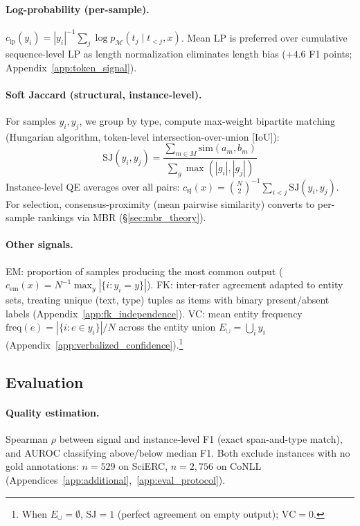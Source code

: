 \paragraph{Log-probability (per-sample).}
$c_{\text{lp}}(y_i) = |y_i|^{-1} \sum_{j} \log p_{\mathcal{M}}(t_j \mid t_{<j}, x)$.
Mean LP is preferred over cumulative sequence-level LP as length normalization eliminates length bias ($+4.6$ F1 points; Appendix~\ref{app:token_signal}).

\paragraph{Soft Jaccard (structural, instance-level).}
For samples $y_i, y_j$, we group by type, compute max-weight bipartite matching (Hungarian algorithm, token-level intersection-over-union [IoU]):
\begin{equation}\label{eq:sj}
\text{SJ}(y_i, y_j) = \frac{\sum_{m \in M} \text{sim}(a_m, b_m)}{\sum_{g} \max(|g_i|, |g_j|)}
\end{equation}
Instance-level QE averages over all pairs: $c_{\text{sj}}(x) = \binom{N}{2}^{-1} \sum_{i<j} \text{SJ}(y_i, y_j)$.
For selection, consensus-proximity (mean pairwise similarity) converts to per-sample rankings via MBR (\S\ref{sec:mbr_theory}).

\paragraph{Other signals.}
EM: proportion of samples producing the most common output ($c_{\text{em}}(x) = N^{-1} \max_{y} |\{i : y_i = y\}|$).
FK: inter-rater agreement \cite{fleiss1971agreement} adapted to entity sets, treating unique (text, type) tuples as items with binary present/absent labels (Appendix~\ref{app:fk_independence}).
VC: mean entity frequency $\text{freq}(e) = |\{i : e \in y_i\}| / N$ across the entity union $E_\cup = \bigcup_i y_i$ (Appendix~\ref{app:verbalized_confidence}).\footnote{When $E_\cup = \emptyset$, SJ${=}1$ (perfect agreement on empty output); $\text{VC}{=}0$.}

\subsection{Evaluation}\label{sec:evaluation}

\paragraph{Quality estimation.}
Spearman $\rho$ between signal and instance-level F1 (exact span-and-type match), and AUROC classifying above/below median F1.
Both exclude instances with no gold annotations: $n{=}529$ on SciERC, $n{=}2{,}756$ on CoNLL (Appendices~\ref{app:additional},~\ref{app:eval_protocol}).

